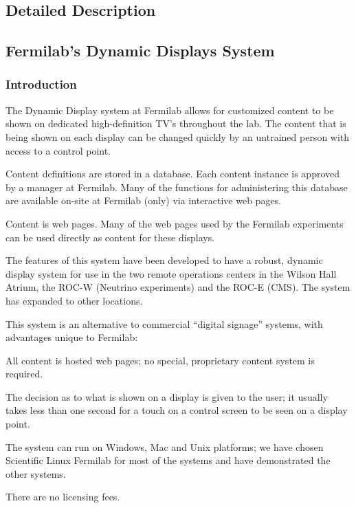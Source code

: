 \subsection{Detailed Description}
\subsection*{Fermilab's Dynamic Displays System}

\subsubsection*{Introduction}

The Dynamic Display system at Fermilab allows for customized content to be shown on dedicated high-\/definition T\-V’s throughout the lab. The content that is being shown on each display can be changed quickly by an untrained person with access to a control point. 

Content definitions are stored in a database. Each content instance is approved by a manager at Fermilab. Many of the functions for administering this database are available on-\/site at Fermilab (only) via interactive web pages. 

Content is web pages. Many of the web pages used by the Fermilab experiments can be used directly as content for these displays. 

The features of this system have been developed to have a robust, dynamic display system for use in the two remote operations centers in the Wilson Hall Atrium, the R\-O\-C-\/\-W (Neutrino experiments) and the R\-O\-C-\/\-E (C\-M\-S). The system has expanded to other locations. 

This system is an alternative to commercial “digital signage” systems, with advantages unique to Fermilab\-: 
\begin{DoxyEnumerate}
\item All content is hosted web pages; no special, proprietary content system is required. 
\item The decision as to what is shown on a display is given to the user; it usually takes less than one second for a touch on a control screen to be seen on a display point. 
\item The system can run on Windows, Mac and Unix platforms; we have chosen Scientific Linux Fermilab for most of the systems and have demonstrated the other systems. 
\item There are no licensing fees. 
\end{DoxyEnumerate}

